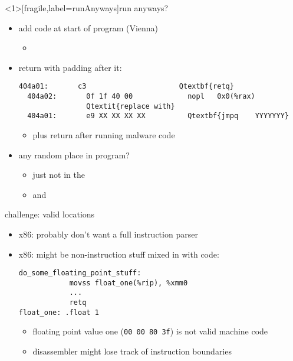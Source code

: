 \begin{frame}<1>[fragile,label=runAnyways]{run anyways?}
    \begin{itemize}
    \item add code at start of program (Vienna)
        \begin{itemize}
        \item {}
        \end{itemize}
    \item return with padding after it:
\begin{Verbatim}[fontsize=\fontsize{10}{11}\selectfont,commandchars=Q\{\}]
  404a01:       c3                      Qtextbf{retq}
  404a02:       0f 1f 40 00             nopl   0x0(%rax)
                Qtextit{replace with}
  404a01:       e9 XX XX XX XX          Qtextbf{jmpq    YYYYYYY}
\end{Verbatim}
        \begin{itemize}
        \item plus return after running malware code
        \end{itemize}
    \item any random place in program?
        \begin{itemize}
        \item just not in the 
        \item and 
        \end{itemize}
    \end{itemize}
\end{frame}

\begin{frame}[fragile,label=findValidChallenge]{challenge: valid locations}
    \begin{itemize}
    \item x86: probably don't want a full instruction parser
    \item x86: might be non-instruction stuff mixed in with code:
\begin{lstlisting}[language=myasm,style=smaller]
do_some_floating_point_stuff:
            movss float_one(%rip), %xmm0
            ...
            retq
float_one: .float 1
\end{lstlisting}
    \begin{itemize}
        \item floating point value one ({\tt 00 00 80 3f}) is not valid machine code
        \item disassembler might lose track of instruction boundaries
    \end{itemize}
    \end{itemize}
\end{frame}

